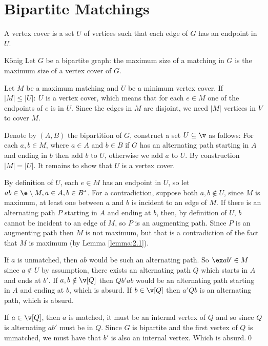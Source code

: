 \section{Bipartite Matchings}
\begin{definition}
    A vertex cover is a set $U$ of vertices such that each edge of $G$ has an endpoint in $U$.
\end{definition}
\begin{customtheorem}{König}
\label{theorem:konig}
    Let $G$ be a bipartite graph: the maximum size of a matching in $G$ is the maximum size of a vertex cover of $G$.
\end{customtheorem}
\begin{prf}
    Let $M$ be a maximum matching and $U$ be a minimum vertex cover. If $|M| \leq |U|:\:U$ is a vertex cover, which means that for each $e \in M$ one of the endpoints of $e$ is in $U$. Since the edges in $M$ are disjoint, we need $|M|$ vertices in $V$ to cover $M$.

    Denote by $(A, B)$ the bipartition of $G$, construct a set $U \subseteq \v$ as follows: For each $a, b \in M$, where $a \in A$ and $b \in B$ if $G$ has an alternating path starting in $A$ and ending in $b$ then add $b$ to $U$, otherwise we add $a$ to $U$. By construction $|M| = |U|$. It remains to show that $U$ is a vertex cover.

    By definition of $U$, each $e \in M$ has an endpoint in $U$, so let $ab \in \e \setminus M, a \in A, b \in B^*$. For a contradiction, suppose both $a, b \notin U$, since $M$ is maximum, at least one between $a$ and $b$ is incident to an edge of $M$. If there is an alternating path $P$ starting in $A$ and ending at $b$, then, by definition of $U$, $b$ cannot be incident to an edge of $M$, so $P$ is an augmenting path. Since $P$ is an augmenting path then $M$ is not maximum, but that is a contradiction of the fact that $M$ is maximum (by Lemma \ref{lemma:2.1}).

    If $a$ is unmatched, then $ab$ would be such an alternating path. So $\ex ab' \in M$ since $a \notin U$ by assumption, there exists an alternating path $Q$ which starts in $A$ and ends at $b'$. If $a, b \notin \v[Q]$ then $Qb'ab$ would be an alternating path starting in $A$ and ending at $b$, which is absurd. If $b \in \v[Q]$ then $a'Qb$ is an alternating path, which is absurd.

    If $a \in \v[Q]$, then $a$ is matched, it must be an internal vertex of $Q$ and so since $Q$ is alternating $ab'$ must be in $Q$. Since $G$ is bipartite and the first vertex of $Q$ is unmatched, we must have that $b'$ is also an internal vertex. Which is absurd.\qed
\end{prf}